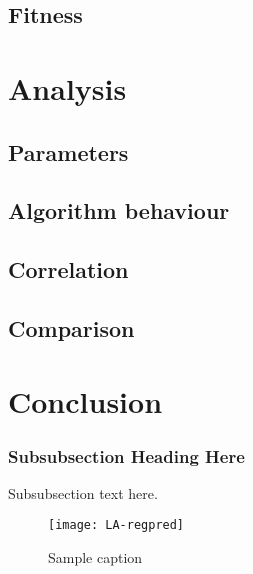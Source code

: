 \documentclass[conference]{IEEEtran}
\begin{document}
\subsection{Fitness}



\section{Analysis}
\subsection{Parameters}

\subsection{Algorithm behaviour}

\subsection{Correlation}

\subsection{Comparison}


\section{Conclusion}



\subsubsection{Subsubsection Heading Here}
Subsubsection text here.
\begin{figure}[!t] 

\centering 

\texttt{[image: LA-regpred]} 

\caption{Sample caption} 

\label{fig:target_area} 

\end{figure}
\end{document}
